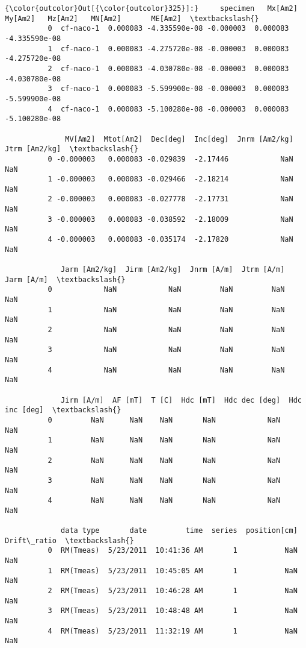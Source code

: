 \documentclass{article}
\begin{document}
            \begin{Verbatim}[commandchars=\\\{\}]
{\color{outcolor}Out[{\color{outcolor}325}]:}     specimen   Mx[Am2]       My[Am2]   Mz[Am2]   MN[Am2]       ME[Am2]  \textbackslash{}
          0  cf-naco-1  0.000083 -4.335590e-08 -0.000003  0.000083 -4.335590e-08   
          1  cf-naco-1  0.000083 -4.275720e-08 -0.000003  0.000083 -4.275720e-08   
          2  cf-naco-1  0.000083 -4.030780e-08 -0.000003  0.000083 -4.030780e-08   
          3  cf-naco-1  0.000083 -5.599900e-08 -0.000003  0.000083 -5.599900e-08   
          4  cf-naco-1  0.000083 -5.100280e-08 -0.000003  0.000083 -5.100280e-08   
          
              MV[Am2]  Mtot[Am2]  Dec[deg]  Inc[deg]  Jnrm [Am2/kg]  Jtrm [Am2/kg]  \textbackslash{}
          0 -0.000003   0.000083 -0.029839  -2.17446            NaN            NaN   
          1 -0.000003   0.000083 -0.029466  -2.18214            NaN            NaN   
          2 -0.000003   0.000083 -0.027778  -2.17731            NaN            NaN   
          3 -0.000003   0.000083 -0.038592  -2.18009            NaN            NaN   
          4 -0.000003   0.000083 -0.035174  -2.17820            NaN            NaN   
          
             Jarm [Am2/kg]  Jirm [Am2/kg]  Jnrm [A/m]  Jtrm [A/m]  Jarm [A/m]  \textbackslash{}
          0            NaN            NaN         NaN         NaN         NaN   
          1            NaN            NaN         NaN         NaN         NaN   
          2            NaN            NaN         NaN         NaN         NaN   
          3            NaN            NaN         NaN         NaN         NaN   
          4            NaN            NaN         NaN         NaN         NaN   
          
             Jirm [A/m]  AF [mT]  T [C]  Hdc [mT]  Hdc dec [deg]  Hdc inc [deg]  \textbackslash{}
          0         NaN      NaN    NaN       NaN            NaN            NaN   
          1         NaN      NaN    NaN       NaN            NaN            NaN   
          2         NaN      NaN    NaN       NaN            NaN            NaN   
          3         NaN      NaN    NaN       NaN            NaN            NaN   
          4         NaN      NaN    NaN       NaN            NaN            NaN   
          
             data type       date         time  series  position[cm]  Drift\_ratio  \textbackslash{}
          0  RM(Tmeas)  5/23/2011  10:41:36 AM       1           NaN          NaN   
          1  RM(Tmeas)  5/23/2011  10:45:05 AM       1           NaN          NaN   
          2  RM(Tmeas)  5/23/2011  10:46:28 AM       1           NaN          NaN   
          3  RM(Tmeas)  5/23/2011  10:48:48 AM       1           NaN          NaN   
          4  RM(Tmeas)  5/23/2011  11:32:19 AM       1           NaN          NaN   
          

\end{Verbatim}
\end{document}
